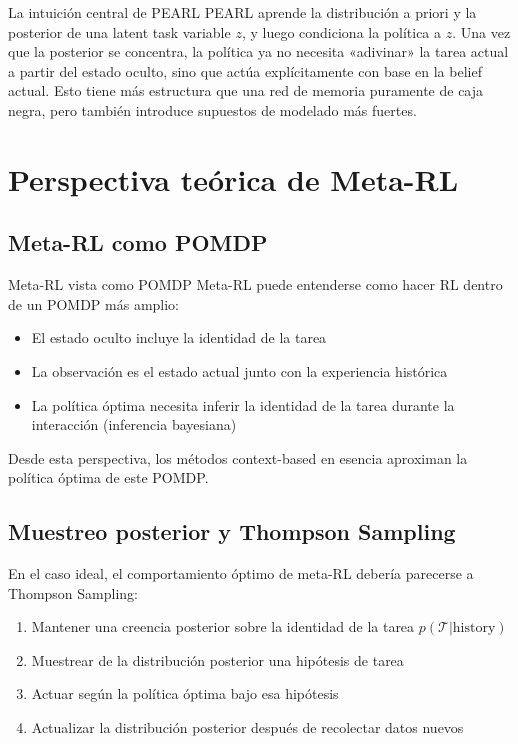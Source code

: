 \documentclass[a4paper]{article}
\begin{document}
\begin{importantbox}{La intuición central de PEARL}
PEARL aprende la distribución a priori y la posterior de una latent task variable $z$, y luego condiciona la política a $z$. Una vez que la posterior se concentra, la política ya no necesita «adivinar» la tarea actual a partir del estado oculto, sino que actúa explícitamente con base en la belief actual. Esto tiene más estructura que una red de memoria puramente de caja negra, pero también introduce supuestos de modelado más fuertes.
\end{importantbox}
\section{Perspectiva teórica de Meta-RL}

\subsection{Meta-RL como POMDP}

\begin{importantbox}{Meta-RL vista como POMDP}
Meta-RL puede entenderse como hacer RL dentro de un POMDP más amplio:
\begin{itemize}
    \item El estado oculto incluye la identidad de la tarea
    \item La observación es el estado actual junto con la experiencia histórica
    \item La política óptima necesita inferir la identidad de la tarea durante la interacción (inferencia bayesiana)
\end{itemize}
Desde esta perspectiva, los métodos context-based en esencia aproximan la política óptima de este POMDP.
\end{importantbox}

\subsection{Muestreo posterior y Thompson Sampling}

En el caso ideal, el comportamiento óptimo de meta-RL debería parecerse a Thompson Sampling:
\begin{enumerate}
    \item Mantener una creencia posterior sobre la identidad de la tarea $p(\mathcal{T} | \text{history})$
    \item Muestrear de la distribución posterior una hipótesis de tarea
    \item Actuar según la política óptima bajo esa hipótesis
    \item Actualizar la distribución posterior después de recolectar datos nuevos
\end{enumerate}
\end{document}
